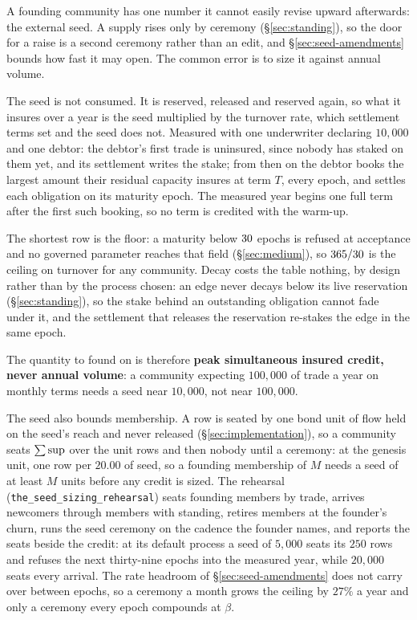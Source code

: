A founding community has one number it cannot easily revise upward afterwards: the
external seed. A supply rises only by ceremony (\S\ref{sec:standing}), so the door for a
raise is a second ceremony rather than an edit, and \S\ref{sec:seed-amendments} bounds how
fast it may open. The common error is to size it against annual volume.

The seed is not consumed. It is reserved, released and reserved again, so what it insures
over a year is the seed multiplied by the turnover rate, which settlement terms set and the
seed does not. Measured with one underwriter declaring $10{,}000$ and one debtor: the
debtor's first trade is uninsured, since nobody has staked on them yet, and its settlement
writes the stake; from then on the debtor books the largest amount their residual capacity
insures at term $T$, every epoch, and settles each obligation on its maturity epoch. The
measured year begins one full term after the first such booking, so no term is credited
with the warm-up.



The shortest row is the floor: a maturity below $30$ epochs is
refused at acceptance and no governed parameter reaches that field (\S\ref{sec:medium}),
so $365 / 30$ is the ceiling on turnover for any community. Decay
costs the table nothing, by design rather than by the process chosen: an edge never decays
below its live reservation (\S\ref{sec:standing}), so the stake behind an outstanding
obligation cannot fade under it, and the settlement that releases the reservation
re-stakes the edge in the same epoch.

The quantity to found on is therefore \textbf{peak simultaneous insured credit, never
annual volume}: a community expecting $100{,}000$ of trade a year on monthly terms needs a
seed near $10{,}000$, not near $100{,}000$.

The seed also bounds membership. A row is seated by one bond unit of flow held on the
seed's reach and never released (\S\ref{sec:implementation}), so a community seats
$\sum \mathrm{sup}$ over the unit rows and then nobody until a ceremony: at the genesis unit,
one row per $20.00$ of seed, so a founding membership of $M$ needs a seed of at least $M$
units before any credit is sized. The rehearsal (\texttt{the\_seed\_sizing\_rehearsal})
seats founding members by trade, arrives newcomers through members with standing, retires
members at the founder's churn, runs the seed ceremony on the cadence the founder names,
and reports the seats beside the credit: at its default process a seed of $5{,}000$ seats
its $250$ rows and refuses the next thirty-nine epochs into the measured year, while
$20{,}000$ seats every arrival. The rate headroom of \S\ref{sec:seed-amendments} does not
carry over between epochs, so a ceremony a month grows the ceiling by $27\%$ a year and
only a ceremony every epoch compounds at $\beta$.

